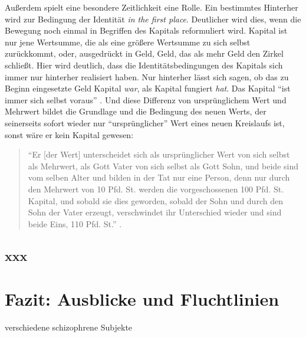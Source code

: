 \documentclass[12pt,
               DIV13,
               paper=a4,
               twoside=false,
               onehalfspacing,
               bibliography=totoc,
               toc=graduated,
               draft,
               ]{scrartcl}
\newcommand{\pc}[2]{\parencite[#1]{#2}}
\newcommand{\worries}[1]{\ifdraft{\textcolor{blue}{\texttt{(#1)}}}{}}
\begin{document}
Außerdem spielt eine besondere Zeitlichkeit eine Rolle. Ein bestimmtes
Hinterher wird zur Bedingung der Identität \emph{in the first place}.
Deutlicher wird dies, wenn die Bewegung noch einmal in Begriffen des
Kapitals reformuliert wird. Kapital ist nur jene Wertsumme, die als
eine größere Wertsumme zu sich selbst zurückkommt, oder, ausgedrückt
in Geld, Geld, das als mehr Geld den Zirkel schließt. \worries{Falte}
Hier wird deutlich, dass die Identitätsbedingungen des Kapitals sich
immer nur hinterher realisiert haben. Nur hinterher lässt sich sagen,
ob das zu Beginn eingesetzte Geld Kapital \emph{war}, als Kapital
fungiert \emph{hat}. Das Kapital "`ist immer sich selbst voraus"'
\pc{125}{strauss}. Und diese Differenz von ursprünglichem Wert und
Mehrwert bildet die Grundlage und die Bedingung des neuen Werts, der
seinerseits sofort wieder nur "`ursprünglicher"' Wert eines neuen
Kreislaufs ist, sonst wäre er kein Kapital gewesen:
%
\begin{spacing}{1}
\begin{quote}
"`Er [der Wert] unterscheidet sich als ursprünglicher
Wert von sich selbst als Mehrwert, als Gott Vater von sich selbst als
Gott Sohn, und beide sind vom selben Alter und bilden in der Tat nur
eine Person, denn nur durch den Mehrwert von 10 Pfd. St. werden die
vorgeschossenen 100 Pfd. St. Kapital, und sobald sie dies geworden,
sobald der Sohn und durch den Sohn der Vater erzeugt, verschwindet ihr
Unterschied wieder und sind beide Eins, 110 Pfd. St."' \pc{S. 169
f.}{kap}.
\end{quote}
\end{spacing}


\subsection{xxx}


\section{Fazit: Ausblicke und Fluchtlinien}

verschiedene schizophrene Subjekte


\newpage
\printshorthands
\printbibliography
\end{document}
